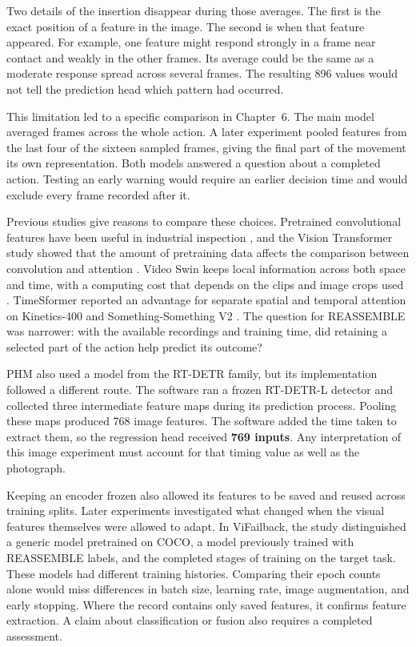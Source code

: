 Two details of the insertion disappear during those averages. The first is the exact position of a feature in the image. The second is when that feature appeared. For example, one feature might respond strongly in a frame near contact and weakly in the other frames. Its average could be the same as a moderate response spread across several frames. The resulting 896 values would not tell the prediction head which pattern had occurred.

This limitation led to a specific comparison in Chapter~6. The main model averaged frames across the whole action. A later experiment pooled features from the last four of the sixteen sampled frames, giving the final part of the movement its own representation. Both models answered a question about a completed action. Testing an early warning would require an earlier decision time and would exclude every frame recorded after it.

Previous studies give reasons to compare these choices. Pretrained convolutional features have been useful in industrial inspection \parencite{Roth2022Towards}, and the Vision Transformer study showed that the amount of pretraining data affects the comparison between convolution and attention \parencite{P010}. Video Swin keeps local information across both space and time, with a computing cost that depends on the clips and image crops used \parencite{P013}. TimeSformer reported an advantage for separate spatial and temporal attention on Kinetics-400 and Something-Something V2 \parencite[Table~1]{P034}. The question for REASSEMBLE was narrower: with the available recordings and training time, did retaining a selected part of the action help predict its outcome?

PHM also used a model from the RT-DETR family, but its implementation followed a different route. The software ran a frozen RT-DETR-L detector and collected three intermediate feature maps during its prediction process. Pooling these maps produced 768 image features. The software added the time taken to extract them, so the regression head received \textbf{769 inputs}. Any interpretation of this image experiment must account for that timing value as well as the photograph.

Keeping an encoder frozen also allowed its features to be saved and reused across training splits. Later experiments investigated what changed when the visual features themselves were allowed to adapt. In ViFailback, the study distinguished a generic model pretrained on COCO, a model previously trained with REASSEMBLE labels, and the completed stages of training on the target task. These models had different training histories. Comparing their epoch counts alone would miss differences in batch size, learning rate, image augmentation, and early stopping. Where the record contains only saved features, it confirms feature extraction. A claim about classification or fusion also requires a completed assessment.

